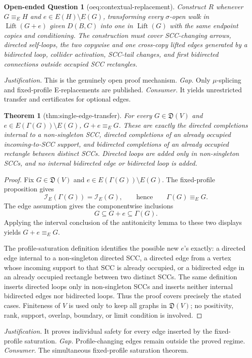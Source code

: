 \documentclass{article}
\newtheorem{theorem}{Theorem}
\newtheorem{openendedquestion}{Open-ended Question}
\begin{document}
\begin{openendedquestion}[oeq:contextual-replacement]\label{oeq:contextual-replacement}
Construct \(R\) whenever \(G\equiv_E H\) and \(e\in E(H)\setminus E(G)\), transforming every \(\sigma\)-open walk in \(\operatorname{Lift}(G+e)\) given \(D(B,C)\) into one in \(\operatorname{Lift}(G)\) with the same endpoint copies and conditioning. The construction must cover SCC-changing arrows, directed self-loops, the two copywise and one cross-copy lifted edges generated by a bidirected loop, collider activation, SCC-tail changes, and first bidirected connections outside occupied SCC rectangles.
\end{openendedquestion}
\par\smallskip\noindent \textit{Justification.} This is the genuinely open proof mechanism. \textit{Gap.} Only \(\mu\)-splicing and fixed-profile E-replacements are published. \textit{Consumer.} It yields unrestricted transfer and certificates for optional edges.

\begin{theorem}[thm:single-edge-transfer]\label{thm:single-edge-transfer}
For every \(G\in\mathfrak D(V)\) and \(e\in E(\Gamma(G))\setminus E(G)\), \(G+e\equiv_EG\). These are exactly the directed completions internal to a non-singleton SCC, directed completions of an already occupied incoming-to-SCC support, and bidirected completions of an already occupied rectangle between distinct SCCs. Directed loops are added only in non-singleton SCCs, and no internal bidirected edge or bidirected loop is added.
\end{theorem}
\begin{proof}
Fix \(G\in\mathfrak D(V)\) and \(e\in E(\Gamma(G))\setminus E(G)\).  The fixed-profile proposition gives
\[
 \mathcal I_E(\Gamma(G))=\mathcal I_E(G),
 \qquad\text{hence}\qquad \Gamma(G)\equiv_EG.
\]
The edge assumption gives the componentwise inclusions
\[
 G\subseteq G+e\subseteq\Gamma(G).
\]
Applying the interval conclusion of the antitonicity lemma to these two displays yields \(G+e\equiv_EG\).

The profile-saturation definition identifies the possible new \(e\)'s exactly: a directed edge internal to a non-singleton directed SCC, a directed edge from a vertex whose incoming support to that SCC is already occupied, or a bidirected edge in an already occupied rectangle between two distinct SCCs.  The same definition inserts directed loops only in non-singleton SCCs and inserts neither internal bidirected edges nor bidirected loops.  Thus the proof covers precisely the stated cases.  Finiteness of \(V\) is used only to keep all graphs in \(\mathfrak D(V)\); no positivity, rank, support, overlap, boundary, or limit condition is involved.
\end{proof}
\par\smallskip\noindent \textit{Justification.} It proves individual safety for every edge inserted by the fixed-profile saturation. \textit{Gap.} Profile-changing edges remain outside the proved regime. \textit{Consumer.} The simultaneous fixed-profile saturation theorem.
\end{document}
